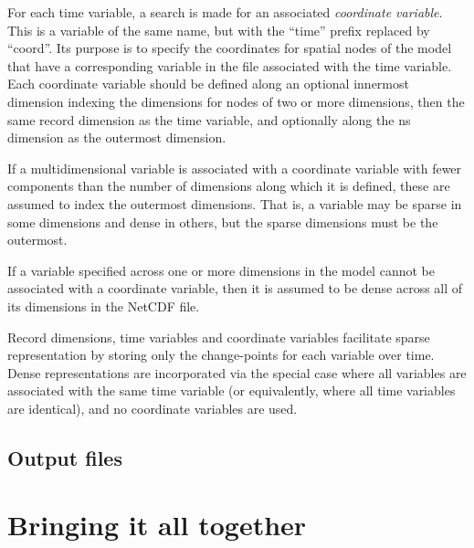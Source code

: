 For each time variable, a search is made for an associated \emph{coordinate
  variable}. This is a variable of the same name,
but with the ``time'' prefix replaced by ``coord''. Its purpose is to specify
the coordinates for spatial nodes of the model that have a corresponding
variable in the file associated with the time variable. Each coordinate
variable should be defined along an optional innermost dimension indexing the
dimensions for nodes of two or more dimensions, then the same record dimension
as the time variable, and optionally along the \textsf{ns} dimension as the
outermost dimension.

If a multidimensional variable is associated with a coordinate variable with
fewer components than the number of dimensions along which it is defined,
these are assumed to index the outermost dimensions. That is, a variable may
be sparse in some dimensions and dense in others, but the sparse dimensions
must be the outermost.

If a variable specified across one or more dimensions in the model cannot be
associated with a coordinate variable, then it is assumed to be dense across
all of its dimensions in the NetCDF file.

Record dimensions, time variables and coordinate variables facilitate sparse
representation by storing only the change-points for each variable over
time. Dense representations are incorporated via the special case where all
variables are associated with the same time variable (or equivalently, where
all time variables are identical), and no coordinate variables are used.

\subsection{Output files}

\section{Bringing it all together\label{Bringing_it_all_together}}

